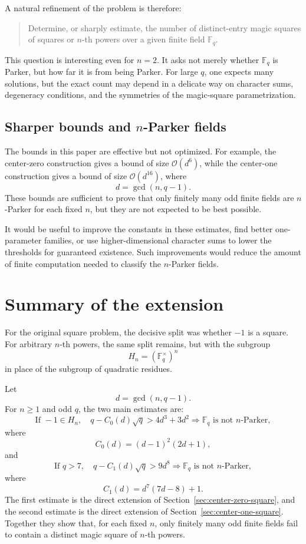 \documentclass{article}
\newcommand{\mc}{\mathcal}
\newcommand{\F}{\mathbb F}
\theoremstyle{definition}
\numberwithin{equation}{section}
\begin{document}
A natural refinement of the problem is therefore:
\begin{quote}
Determine, or sharply estimate, the number of distinct-entry magic squares of
squares or \(n\)-th powers over a given finite field \(\F_q\).
\end{quote}
This question is interesting even for \(n=2\). It asks not merely whether
\(\F_q\) is Parker, but how far it is from being Parker. For large \(q\), one
expects many solutions, but the exact count may depend in a delicate way on
character sums, degeneracy conditions, and the symmetries of the magic-square
parametrization.

\subsection{Sharper bounds and \(n\)-Parker fields}

The bounds in this paper are effective but not optimized. For example, the
center-zero construction gives a bound of size \(\mc{O}(d^6)\), while the center-one
construction gives a bound of size \(\mc{O}(d^{16})\), where
\[
d=\gcd(n,q-1).
\]
These bounds are sufficient to prove that only finitely many odd finite fields
are \(n\)-Parker for each fixed \(n\), but they are not expected to be best
possible.

It would be useful to improve the constants in these estimates, find better
one-parameter families, or use higher-dimensional character sums to lower the
thresholds for guaranteed existence. Such improvements would reduce the amount
of finite computation needed to classify the \(n\)-Parker fields.


\section{Summary of the extension}

For the original square problem, the decisive split was whether \(-1\) is a
square.  For arbitrary \(n\)-th powers, the same split remains, but with the
subgroup
\[
H_n=(\F_q^\times)^n
\]
in place of the subgroup of quadratic residues.

Let
\[
d=\gcd(n,q-1).
\]
For \(n\geq1\) and odd \(q\), the two main estimates are:
\[
\boxed{
\text{If }-1\in H_n,
\quad
q-C_0(d)\sqrt q>4d^3+3d^2
\Longrightarrow
\F_q\text{ is not }n\text{-Parker},
}
\]
where
\[
C_0(d)=(d-1)^2(2d+1),
\]
and
\[
\boxed{
\text{If }q>7,\quad
q-C_1(d)\sqrt q>9d^8
\Longrightarrow
\F_q\text{ is not }n\text{-Parker},
}
\]
where
\[
C_1(d)=d^7(7d-8)+1.
\]
The first estimate is the direct extension of Section~\ref{sec:center-zero-square}, and the second estimate
is the direct extension of Section~\ref{sec:center-one-square}.  Together they show that, for each fixed
\(n\), only finitely many odd finite fields fail to contain a distinct magic
square of \(n\)-th powers.
\end{document}
